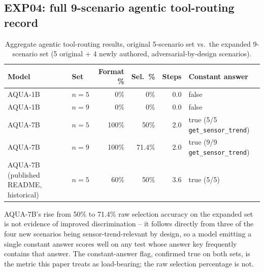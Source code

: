 \subsection{EXP04: full 9-scenario agentic tool-routing record}

\begin{table}[h]
\centering
\footnotesize
\caption{Aggregate agentic tool-routing results, original 5-scenario set vs.\ the expanded
9-scenario set (5 original + 4 newly authored, adversarial-by-design scenarios).}
\label{tab:exp04-full}
\begin{tabular}{@{}p{3.4cm}lrrrp{3.6cm}@{}}
\toprule
Model & Set & Format \% & Sel.\ \% & Steps & Constant answer \\
\midrule
AQUA-1B & $n{=}5$ & 0\% & 0\% & 0.0 & false \\
AQUA-1B & $n{=}9$ & 0\% & 0\% & 0.0 & false \\
AQUA-7B & $n{=}5$ & 100\% & 50\% & 2.0 & true (5/5 \texttt{get\_sensor\_trend}) \\
AQUA-7B & $n{=}9$ & 100\% & 71.4\% & 2.0 & true (9/9 \texttt{get\_sensor\_trend}) \\
AQUA-7B (published README, historical) & $n{=}5$ & 60\% & 50\% & 3.6 & true (5/5) \\
\bottomrule
\end{tabular}
\end{table}

AQUA-7B's rise from 50\% to 71.4\% raw selection accuracy on the expanded set is not evidence of
improved discrimination -- it follows directly from three of the four new scenarios being
sensor-trend-relevant by design, so a model emitting a single constant answer scores well on any
test whose answer key frequently contains that answer. The constant-answer flag, confirmed true on
both sets, is the metric this paper treats as load-bearing; the raw selection percentage is not.
